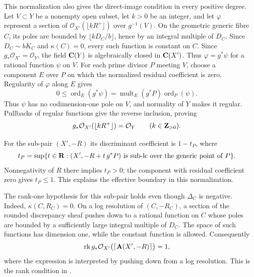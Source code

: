 This normalization also gives the direct-image condition in every
positive degree. Let \(V\subset Y\) be a nonempty open subset, let
\(k>0\) be an integer, and let \(\varphi\) represent a section of
\(\mathcal O_{X'}(\lfloor kR^+\rfloor)\) over \(g^{-1}(V)\).
On the geometric generic fibre \(C\), its poles are bounded by
\(\lfloor kD_C/b\rfloor\), hence by an integral multiple of
\(D_C\). Since \(D_C\sim bK_C\) and \(\kappa(C)=0\), every such
function is constant on \(C\). Since \(g_*\mathcal O_{X'}=\mathcal O_Y\),
the field \(\mathbf C(Y)\) is algebraically closed in \(\mathbf C(X')\).
Thus \(\varphi=g^*\psi\) for a rational function \(\psi\) on
\(V\). For each prime divisor \(P\) meeting \(V\),
choose a component \(E\) over \(P\) on which the normalized
residual coefficient is zero. Regularity of \(\varphi\) along
\(E\) gives
\[
 0\leq\operatorname{ord}_E(g^*\psi)
   =\operatorname{mult}_E(g^*P)\operatorname{ord}_P(\psi).
\]
Thus \(\psi\) has no codimension-one pole on \(V\), and normality
of \(Y\) makes it regular. Pullbacks of regular functions give the
reverse inclusion, proving
\[
 g_*\mathcal O_{X'}(\lfloor kR^+\rfloor)=\mathcal O_Y
 \qquad(k\in\mathbf Z_{>0}).
\]

For the sub-pair \((X',-R)\) its discriminant coefficient is \(1-t_P\),
where
\[
 t_P=\sup\{t\in\mathbf R:
       (X',-R+t\,g^*P)\text{ is sub-lc over the generic point of }P\}.
\]
Nonnegativity of \(R\) there implies \(t_P>0\); the component with
residual coefficient zero gives \(t_P\leq1\).
This explains the effective boundary in this normalization.

The rank-one hypothesis for this sub-pair holds even though
\(\Delta_C\) is negative.  Indeed, \(\kappa(C,R_C)=0\).
On a log resolution of \((C,-R_C)\), a section of the rounded
discrepancy sheaf pushes down to a rational function on \(C\) whose
poles are bounded by a sufficiently large integral multiple of
\(D_C\).  The space of such functions has dimension one, while the
constant function is allowed.  Consequently
\[
 \operatorname{rk} g_*\mathcal O_{X'}\bigl(\lceil\mathbf A(X',-R)\rceil\bigr)=1,
\]
where the expression is interpreted by pushing down from a log
resolution.  This is the rank condition in
\cite[introductory assumptions (1)--(3)]{AmbroBoundary}.


